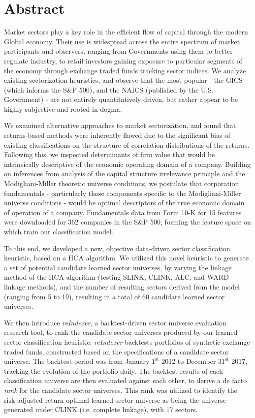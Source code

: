 \documentclass[../main.tex]{subfiles}
\begin{document}
\section*{Abstract}

Market sectors play a key role in the efficient flow of capital through the modern Global economy. Their use is widespread across the entire spectrum of market participants and observers, ranging from Governments using them to better regulate industry, to retail investors gaining exposure to particular segments of the economy through exchange traded funds tracking sector indices. We analyze existing sectorization heuristics, and observe that the most popular - the GICS (which informs the S\&P 500), and the NAICS (published by the U.S. Government) - are not entirely quantitatively driven, but rather appear to be highly subjective and rooted in dogma.

We examined alternative approaches to market sectorization, and found that returns-based methods were inherently flawed due to the significant bias of existing classifications on the structure of correlation distributions of the returns. Following this, we inspected determinants of firm value that would be intrinsically descriptive of the economic operating domain of a company. Building on inferences from analysis of the capital structure irrelevance principle and the Modigliani-Miller theoretic universe conditions, we postulate that corporation fundamentals - particularly those components specific to the Modigliani-Miller universe conditions - would be optimal descriptors of the true economic domain of operation of a company. Fundamentals data from Form 10-K for 15 features were downloaded for 362 companies in the S\&P 500, forming the feature space on which train our classification model.

To this end, we developed a new, objective data-driven sector classification heuristic, based on a HCA algorithm. We utilized this novel heuristic to generate a set of potential candidate learned sector universes, by varying the linkage method of the HCA algorithm (testing SLINK, CLINK, ALC, and WARD linkage methods), and the number of resulting sectors derived from the model (ranging from 5 to 19), resulting in a total of 60 candidate learned sector universes.

We then introduce \textit{reIndexer}, a backtest-driven sector universe evaluation research tool, to rank the candidate sector universes produced by our learned sector classification heuristic. \textit{reIndexer} backtests portfolios of synthetic exchange traded funds, constructed based on the specifications of a candidate sector universe. The backtest period was from January $1^\text{st}$ 2012 to December $31^\text{st}$ 2017, tracking the evolution of the portfolio daily. The backtest results of each classification universe are then evaluated against each other, to derive a de facto \textit{rank} for the candidate sector universes. This rank was utilized to identify the risk-adjusted return optimal learned sector universe as being the universe generated under CLINK (i.e. complete linkage), with 17 sectors.
\end{document}
